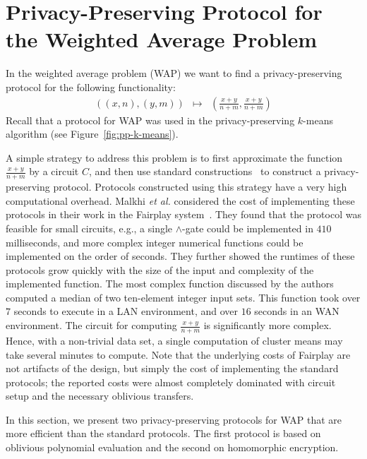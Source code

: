 \section{Privacy-Preserving Protocol for \\ the Weighted Average Problem}
\label{sec:WAP}

In the weighted average problem (WAP) we want to find
a privacy-preserving protocol for the following functionality:
\begin{eqnarray*}
((x,n),(y,m)) & \longmapsto & (\frac{x+y}{n+m}, \frac{x+y}{n+m})
\end{eqnarray*}
Recall that a protocol for WAP was used in
the privacy-preserving $k$-means algorithm (see Figure~\ref{fig:pp-k-means}).


A simple strategy to address this problem is to first approximate the
function $\frac{x+y}{n+m}$ by a circuit $C$, and then use standard
constructions~\cite{GMW87,Goldreich:JACM:91,Yao86} to construct
a privacy-preserving protocol.  Protocols constructed using this
strategy have a very high computational overhead. Malkhi {\it et al.} 
considered the cost of implementing these protocols in their work in
the Fairplay system~\cite{mnps04}.  They found that the protocol was
feasible for small circuits, e.g., a single $\wedge$-gate could be
implemented in $410$ milliseconds, and more complex integer numerical
functions could be implemented on the order of seconds.  They further
showed the runtimes of these protocols grow quickly with the size of
the input and complexity of the implemented function.  The most
complex function discussed by the authors computed a median of two
ten-element integer input sets.  This function took over $7$ seconds
to execute in a LAN environment, and over $16$ seconds in an WAN
environment.  The circuit for computing $\frac{x+y}{n+m}$ is
significantly more complex. Hence, with a non-trivial data set, a
single computation of cluster means may take several minutes to compute.  Note that
the underlying costs of Fairplay are not artifacts of the design, but
simply the cost of implementing the standard protocols; the reported
costs were almost completely dominated with circuit setup and the
necessary oblivious transfers.

In this section, we present two privacy-preserving protocols for WAP
that are more efficient than the standard protocols. The first
protocol is based on oblivious polynomial evaluation and the second on
homomorphic encryption. 


